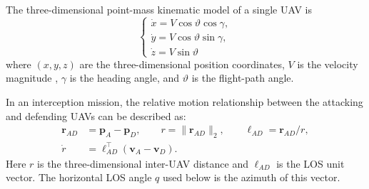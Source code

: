 \documentclass[lettersize,journal]{IEEEtran}
\providecommand{\DIFadd}[1]{{\protect\color{blue} #1}} %
\providecommand{\DIFdel}[1]{} %
\providecommand{\DIFaddbegin}{} %
\providecommand{\DIFaddend}{} %
\providecommand{\DIFdelbegin}{} %
\providecommand{\DIFdelend}{} %
\begin{document}
The \DIFaddbegin \DIFadd{three-dimensional point-mass }\DIFaddend kinematic model of a single UAV \DIFdelbegin \DIFdel{can be simplified as
}%
\DIFdelend \DIFaddbegin \DIFadd{is
}\begin{equation}
\label{yundongxue}
\left\{\begin{matrix}
\dot{x}=V\cos\vartheta\cos\gamma,\\
\dot{y}=V\cos\vartheta\sin\gamma,\\
\dot{z}=V\sin\vartheta
\end{matrix}\right.
\end{equation}\DIFaddend 
where \DIFdelbegin \DIFdel{\emph{x}}\DIFdelend \DIFaddbegin \DIFadd{\((x,y,z)\) are the three-dimensional position coordinates}\DIFaddend , \DIFdelbegin \DIFdel{\emph{y} is the position coordinates of the UAV in two-dimensional space, \emph{V} }\DIFdelend \DIFaddbegin \DIFadd{\(V\) }\DIFaddend is
the velocity magnitude\DIFdelbegin \DIFdel{of the UAV, and $\gamma$ is
the navigation }\DIFdelend \DIFaddbegin \DIFadd{, \(\gamma\) is the heading angle, and \(\vartheta\) is
the flight-path }\DIFaddend angle.

In an interception mission, the relative motion relationship between the attacking and
defending UAVs can be described as:
\DIFdelbegin %
\DIFdelend \DIFaddbegin \begin{equation}
\label{gongfang}
\begin{split}
\mathbf r_{AD}&=\mathbf p_A-\mathbf p_D,\qquad
r=\|\mathbf r_{AD}\|_2,\qquad
\boldsymbol{\ell}_{AD}=\mathbf r_{AD}/r,\\
\dot r&=\boldsymbol{\ell}_{AD}^{\top}(\mathbf v_A-\mathbf v_D).
\end{split}
\end{equation}\DIFaddend 
\DIFdelbegin \DIFdel{where $r$ is the }\DIFdelend \DIFaddbegin \DIFadd{Here \(r\) is the three-dimensional }\DIFaddend inter-UAV distance \DIFdelbegin \DIFdel{, $q$ is the line-of-sight angle
, $V_{A}$ ($V_{D}$) is the velocity of the attacking (defending) UAV, and $\gamma_{A}$ ($\gamma_{D}$) is the
corresponding heading angle}\DIFdelend \DIFaddbegin \DIFadd{and
\(\boldsymbol{\ell}_{AD}\) is the LOS unit vector. The horizontal LOS angle
\(q\) used below is the azimuth of this vector}\DIFaddend .
\end{document}
